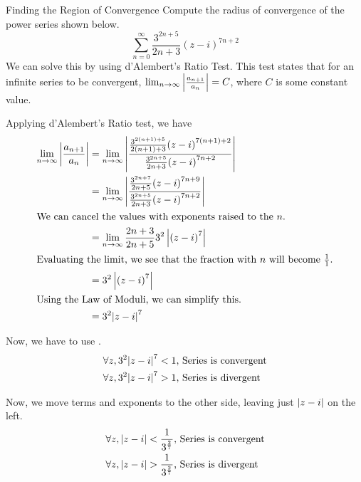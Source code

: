 \begin{example}{Finding the Region of Convergence}
  Compute the radius of convergence of the power series shown below.
  \begin{equation*}
    \sum_{n=0}^{\infty} \frac{3^{2n+5}}{2n+3} {(z-i)}^{7n+2}
  \end{equation*}
  \tcblower{}
  We can solve this by using d'Alembert's Ratio Test.
  This test states that for an infinite series to be convergent, $\lim_{n \to \infty} \left\lvert \frac{a_{n+1}}{a_{n}} \right\rvert = C$, where $C$ is some constant value.

  Applying d'Alembert's Ratio test, we have
  \begin{align*}
    \lim_{n \to \infty} \left\lvert \frac{a_{n+1}}{a_{n}} \right\rvert &= \lim_{n \to \infty} \left\lvert  \frac{\frac{3^{2(n+1) + 5}}{2(n+1) + 3} {(z-i)}^{7(n+1)+2}}{\frac{3^{2n+5}}{2n+3} {(z-i)}^{7n+2}} \right\rvert \\
                                                        &= \lim_{n \to \infty} \left\lvert \frac{\frac{3^{2n+7}}{2n+5} {(z-i)}^{7n+9}}{\frac{3^{2n+5}}{2n+3} {(z-i)}^{7n+2}} \right\rvert \\
    \shortintertext{We can cancel the values with exponents raised to the $n$.}
                                                        &= \lim_{n \to \infty} \frac{2n + 3}{2n + 5} 3^{2} \left\lvert {(z-i)}^{7} \right\rvert \\
    \shortintertext{Evaluating the limit, we see that the fraction with $n$ will become $\frac{1}{1}$.}
                                                        &= 3^{2} \left\lvert {(z-i)}^{7} \right\rvert \\
    \shortintertext{Using the Law of Moduli, we can simplify this.}
                                                        &= 3^{2} {\left\lvert z-i \right\rvert}^{7}
  \end{align*}

  Now, we have to use .
  \begin{align*}
    \forall z, 3^{2} {\left\lvert z-i \right\rvert}^{7} &< 1 \text{, Series is convergent} \\
    \forall z, 3^{2} {\left\lvert z-i \right\rvert}^{7} &> 1 \text{, Series is divergent} \\
  \end{align*}

  Now, we move terms and exponents to the other side, leaving just $\left\lvert z-i \right\rvert$ on the left.
  \begin{align*}
    \forall z, \left\lvert z-i \right\rvert &< \frac{1}{3^{\frac{2}{7}}} \text{, Series is convergent} \\
    \forall z, \left\lvert z-i \right\rvert &> \frac{1}{3^{\frac{2}{7}}} \text{, Series is divergent} \\
  \end{align*}
\end{example}

